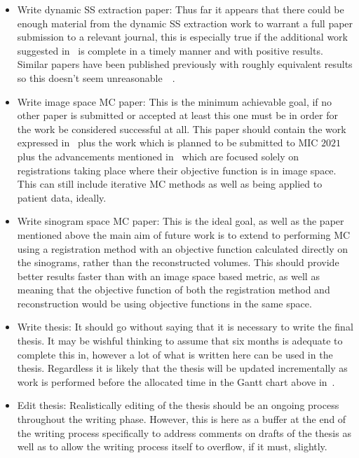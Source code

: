 \begin{itemize}
                \item Write dynamic \gls{SS} extraction paper: Thus far it appears that there could be enough material from the dynamic \gls{SS} extraction work to warrant a full paper submission to a relevant journal, this is especially true if the additional work suggested in~ is complete in a timely manner and with positive results. Similar papers have been published previously with roughly equivalent results so this doesn't seem unreasonable~~.
                
                \item Write image space \gls{MC} paper: This is the minimum achievable goal, if no other paper is submitted or accepted at least this one must be in order for the work be considered successful at all. This paper should contain the work expressed in~ plus the work which is planned to be submitted to \gls{MIC} $2021$ plus the advancements mentioned in~ which are focused solely on registrations taking place where their objective function is in image space. This can still include iterative \gls{MC} methods as well as being applied to patient data, ideally.
                
                \item Write sinogram space \gls{MC} paper: This is the ideal goal, as well as the paper mentioned above the main aim of future work is to extend to performing \gls{MC} using a registration method with an objective function calculated directly on the sinograms, rather than the reconstructed volumes. This should provide better results faster than with an image space based metric, as well as meaning that the objective function of both the registration method and reconstruction would be using objective functions in the same space.
                
                \item Write thesis: It should go without saying that it is necessary to write the final thesis. It may be wishful thinking to assume that six months is adequate to complete this in, however a lot of what is written here can be used in the thesis. Regardless it is likely that the thesis will be updated incrementally as work is performed before the allocated time in the Gantt chart above in~.
    
                \item Edit thesis: Realistically editing of the thesis should be an ongoing process throughout the writing phase. However, this is here as a buffer at the end of the writing process specifically to address comments on drafts of the thesis as well as to allow the writing process itself to overflow, if it must, slightly.
            \end{itemize}
        
